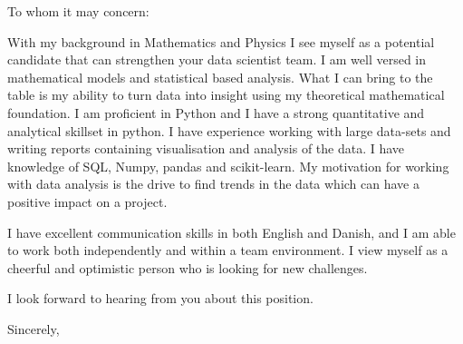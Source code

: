 \documentclass[10pt,a4paper]{letter}
\begin{document}
\begin{letter}{}
\opening{To whom it may concern:}

With my background in Mathematics and Physics I see myself as a potential candidate that can strengthen your data scientist team. I am well versed in mathematical models and statistical based analysis. What I can bring to the table is my ability to turn data into insight using my theoretical mathematical foundation. I am proficient in Python and I have a strong quantitative and analytical skillset in python. I have experience working with large data-sets and writing reports containing visualisation and analysis of the data.  I have knowledge of SQL, Numpy, pandas and scikit-learn. My motivation for working with data analysis is the drive to find trends in the data which can have a positive impact on a project. 
 
I have excellent communication skills in both English and Danish, and I am able to work both independently and within a team environment. I view myself as a cheerful and optimistic person who is looking for new challenges.

I look forward to hearing from you about this position.   

\closing{Sincerely,}

\end{letter}

\end{document}
